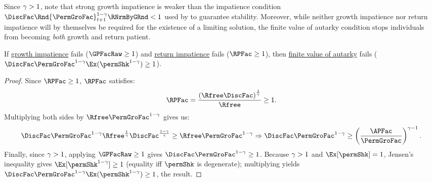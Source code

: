 \documentclass[\econtexRoot/BufferStockTheory]{subfiles}
\begin{document}

Since $\gamma>1$, note that strong growth impatience is weaker than the impatience condition $\DiscFac \Rnd{\PermGroFac}_{t+1}^{1-\CRRA}\RNrmByGRnd<1$ used by \cite{mstIncFluct} to guarantee stability. Moreover, while neither growth impatience nor return impatience will by themselves be required for the existence of a limiting solution, the finite value of autarky condition stops individuals from becoming \textit{both} growth and return patient.

\hypertarget{VAFacDefn}{}
\begin{claim}\label{claim:noRICGIC}
If \hyperlink{GICRaw}{growth impatience} fails ($\GPFacRaw  \geq 1$) and \hyperlink{RIC}{return impatience} fails ($\RPFac \geq 1$), then \hyperlink{FVAC}{finite value of autarky} fails ($\DiscFac \PermGroFac^{1-\CRRA}\Ex(\permShk^{1-\CRRA})\geq 1$).
\end{claim}

\begin{proof}
Since $\RPFac  \geq 1$, $\RPFac $ satisfies:
%
%
\begin{equation}
\RPFac = \frac{\left(\Rfree\DiscFac\right)^{\frac{1}{\CRRA}}}{\Rfree}\geq 1.
\end{equation}
%
Multiplying both sides by $\Rfree\PermGroFac^{1-\CRRA}$ gives us:
%
\begin{equation}
\DiscFac\PermGroFac^{1-\CRRA}\Rfree^{\frac{1}{\CRRA}}\DiscFac^{\frac{1-\CRRA}{\CRRA}}{}\geq\Rfree \PermGroFac^{1-\CRRA} \Rightarrow \DiscFac\PermGroFac^{1-\CRRA}\geq\left(\frac{\APFac}{\PermGroFac}\right)^{\CRRA-1}.
\end{equation}
%
Finally, since $\gamma>1$, applying $\GPFacRaw  \geq 1$ gives $\DiscFac\PermGroFac^{1-\CRRA}\geq 1$.
Because $\gamma>1$ and $\Ex[\permShk]=1$, Jensen's inequality gives $\Ex[\permShk^{1-\CRRA}]\geq 1$ (equality iff $\permShk$ is degenerate); multiplying yields $\DiscFac\PermGroFac^{1-\CRRA}\Ex(\permShk^{1-\CRRA})\geq 1$, the result.

\end{proof}
\end{document}
